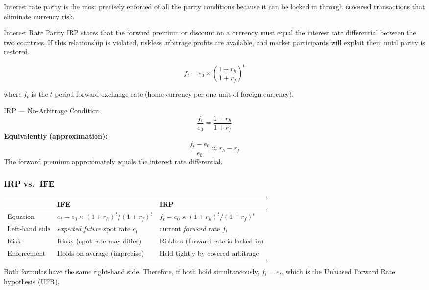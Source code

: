\documentclass[11pt,a4paper]{article}
\begin{document}
Interest rate parity is the most precisely enforced of all the parity conditions because it can be locked in through \textbf{covered} transactions that eliminate currency risk.

\begin{conceptbox}{Interest Rate Parity}
IRP states that the forward premium or discount on a currency must equal the interest rate differential between the two countries. If this relationship is violated, riskless arbitrage profits are available, and market participants will exploit them until parity is restored.

\[
  f_t = e_0 \times \left(\frac{1 + r_h}{1 + r_f}\right)^t
\]

where $f_t$ is the $t$-period forward exchange rate (home currency per one unit of foreign currency).
\end{conceptbox}

\begin{formulabox}{IRP --- No-Arbitrage Condition}
\[
  \frac{f_t}{e_0} = \frac{1 + r_h}{1 + r_f}
\]
\textbf{Equivalently (approximation):}
\[
  \frac{f_t - e_0}{e_0} \approx r_h - r_f
\]
The forward premium approximately equals the interest rate differential.
\end{formulabox}

\subsubsection{IRP vs.\ IFE}

\begin{center}
\begin{tabular}{lll}
\toprule
 & \textbf{IFE} & \textbf{IRP} \\
\midrule
Equation & $e_t = e_0 \times (1+r_h)^t/(1+r_f)^t$ & $f_t = e_0 \times (1+r_h)^t/(1+r_f)^t$ \\
Left-hand side & \textit{expected future} spot rate $e_t$ & current \textit{forward} rate $f_t$ \\
Risk & Risky (spot rate may differ) & Riskless (forward rate is locked in) \\
Enforcement & Holds on average (imprecise) & Held tightly by covered arbitrage \\
\bottomrule
\end{tabular}
\end{center}

Both formulas have the same right-hand side. Therefore, if both hold simultaneously, $f_t = e_t$, which is the Unbiased Forward Rate hypothesis (UFR).
\end{document}
